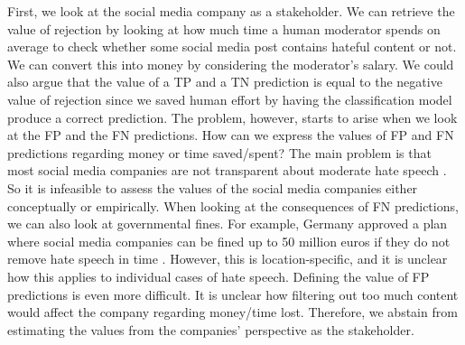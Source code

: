 First, we look at the social media company as a stakeholder.
%
We can retrieve the value of rejection by looking at how much time a human moderator spends on average to check whether some social media post contains hateful content or not.
%
We can convert this into money by considering the moderator's salary.
%
We could also argue that the value of a TP and a TN prediction is equal to the negative value of rejection since we saved human effort by having the classification model produce a correct prediction.
%
The problem, however, starts to arise when we look at the FP and the FN predictions.
%
How can we express the values of FP and FN predictions regarding money or time saved/spent?
%
The main problem is that most social media companies are not transparent about moderate hate speech  \citep{klonick2017new}.
%
So it is infeasible to assess the values of the social media companies either conceptually or empirically.
%
When looking at the consequences of FN predictions, we can also look at governmental fines.
%
For example, Germany approved a plan where social media companies can be fined up to 50 million euros if they do not remove hate speech in time \citep{bbc-firms-face-fine-germany}.
%
However, this is location-specific, and it is unclear how this applies to individual cases of hate speech.
%
Defining the value of FP predictions is even more difficult.
%
It is unclear how filtering out too much content would affect the company regarding money/time lost.
%
Therefore, we abstain from estimating the values from the companies' perspective as the stakeholder.

